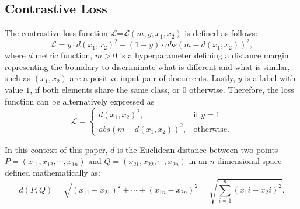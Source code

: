 \subsection{Contrastive Loss}

The contrastive loss function  $\mathcal{L}$=$\mathcal{L}(m, y, x_1, x_2)$ is defined as follows:
\begin{equation}
    \mathcal{L} = y \cdot d(x_1, x_2)^2 + (1 - y) \cdot abs(m - d(x_1, x_2))^2,
\end{equation}
where $d$ metric function, $m > 0$ is a hyperparameter defining a distance margin representing the boundary to discriminate what is different and what is similar, such as $(x_1, x_2)$ are a positive input pair of documents. Lastly, $y$ is a label with value $1$, if both elements share the same class, or $0$ otherwise. Therefore, the loss function can be alternatively expressed as
\begin{equation}
    \mathcal{L} = \begin{cases}
        d(x_1, x_2)^2, & \text{if } y = 1 \\
        abs(m - d(x_1, x_2))^2, & \text{otherwise}.
  \end{cases}
\end{equation}
\vspace{1em}

In this context of this paper, $d$ is the Euclidean distance between two points $P = (x_{11}, x_{12}, \cdots, x_{1n})$ and $Q = (x_{21}, x_{22}, \cdots, x_{2n})$ in an $n$-dimensional space defined mathematically as:
\begin{equation}
d(P,Q)={\sqrt {(x_{11}-x_{21})^{2}+ \cdots +(x_{1n}-x_{2n})^{2}}} = \sqrt{ \sum_{i=1}^{n} (x_1i - x_2i)^2 }.
\end{equation}



